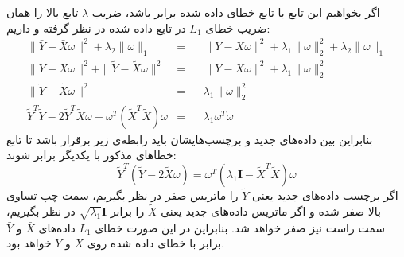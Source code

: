 \documentclass[a4paper, 12pt]{article}
\begin{document}
\begin{enumerate}[A)]
\[	\]
	اگر بخواهیم این تابع با تابع خطای داده شده برابر باشد، ضریب $\lambda$ تابع بالا را همان ضریب خطای $L_1$ در تابع داده شده در نظر گرفته و داریم:
	\[
	\begin{aligned}
		\|\bar{Y} - \bar{X}\omega\|^2 + \lambda_2 \|\omega\|_1 &=&& \|Y-X\omega\|^2 + \lambda_1 \|\omega\|_2^2 + \lambda_2 \|\omega\|_1 \\
		\|Y-X\omega\|^2 + \|\widetilde{Y}-\widetilde{X}\omega\|^2 &=&& \|Y-X\omega\|^2 + \lambda_1 \|\omega\|_2^2 \\
		\|\widetilde{Y}-\widetilde{X}\omega\|^2 &=&& \lambda_1 \|\omega\|_2^2 \\
		\widetilde{Y}^T\widetilde{Y} - 2\widetilde{Y}^T\widetilde{X}\omega + \omega^T(\widetilde{X}^T\widetilde{X})\omega &=&& \lambda_1\omega^T\omega
	\end{aligned}
	\]
	بنابراین بین داده‌های جدید و برچسب‌هایشان باید رابطه‌ی زیر برقرار باشد تا تابع خطاهای مذکور با یکدیگر برابر شوند:
	\[
	\widetilde{Y}^T\left(\widetilde{Y} - 2\widetilde{X}\omega\right) = \omega^T\left(\lambda_1 \bm{I} - \widetilde{X}^T\widetilde{X}\right)\omega
	\]
	اگر برچسب‌ داده‌های جدید یعنی $\widetilde{Y}$ را ماتریس صفر در نظر بگیریم، سمت چپ تساوی بالا صفر شده و اگر ماتریس داده‌های جدید یعنی $\widetilde{X}$ را برابر
	$\sqrt{\lambda_1} \bm{I}$
	در نظر بگیریم، سمت راست نیز صفر خواهد شد. بنابراین در این صورت خطای $L_1$ داده‌های $\bar{X}$ و $\bar{Y}$ برابر با خطای داده شده روی $X$ و $Y$ خواهد بود.
\end{enumerate}
\end{document}
